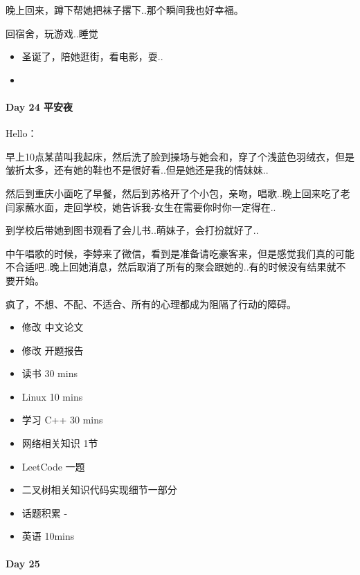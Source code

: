 \documentclass[UTF8,a4paper,8pt]{ctexbook}
\begin{document}
	 	 晚上回来，蹲下帮她把袜子撂下..那个瞬间我也好幸福。
	 	 
	 	 回宿舍，玩游戏..睡觉
	 	 
		 	 \begin{itemize}
		 	 	\item 圣诞了，陪她逛街，看电影，耍..
		 	 	\item 
		 	 \end{itemize}
	 	 
 	 \paragraph{Day 24   平安夜   \quad     }
	 	 Hello：
	 	 
	 	 早上10点某苗叫我起床，然后洗了脸到操场与她会和，穿了个浅蓝色羽绒衣，但是皱折太多，还有她的鞋也不是很好看..但是她还是我的情妹妹..
	 	 
	 	 然后到重庆小面吃了早餐，然后到苏格开了个小包，亲吻，唱歌..晚上回来吃了老闫家蘸水面，走回学校，她告诉我-女生在需要你时你一定得在..
	 	 
	 	 到学校后带她到图书观看了会儿书..萌妹子，会打扮就好了..
	 	
		 中午唱歌的时候，李婷来了微信，看到是准备请吃豪客来，但是感觉我们真的可能不合适吧..晚上回她消息，然后取消了所有的聚会跟她的..有的时候没有结果就不要开始。
		 
		 疯了，不想、不配、不适合、所有的心理都成为阻隔了行动的障碍。
				  \begin{itemize}
				  	\item 修改  中文论文
				  	\item 修改  开题报告
				  	\item 读书       30 mins	
				  	\item Linux      10 mins	  
				  	\item 学习  C++  30 mins 
				  	
				  	\item  网络相关知识 1节
				  	\item  LeetCode    一题
				  	\item  二叉树相关知识代码实现细节一部分 
				  	
				  	\item  话题积累 	- 
				  	\item  英语 10mins
				  \end{itemize}
 	 \paragraph{Day 25      \quad     }
\end{document}
